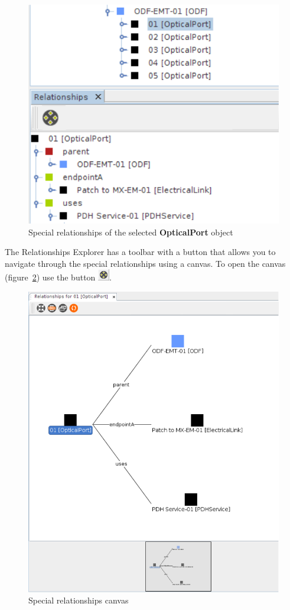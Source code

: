 \documentclass[a4paper]{article}
\begin{document}
		\begin{figure}[h!]
			\centering
			\includegraphics[width=0.4\linewidth]{img/navigation_tree_relationship_explorer.png}
			\caption{Special relationships of the selected \textbf{OpticalPort} object}
			\label{fig:navigation_tree_relationship_explorer}
		\end{figure}
		
		The Relationships Explorer has a toolbar with a button that allows you to navigate through the special relationships using a canvas. To open the canvas (figure~\ref{fig:graphical_representation_relationships}) use the button \includegraphics[width=0.5cm]{img/icon_graphical_representation_relationships.png}.
						
		\begin{figure}[h!]
			\centering
			\includegraphics[width=0.8\linewidth]{img/graphical_representation_relationships.png}
			\caption{Special relationships canvas}
			\label{fig:graphical_representation_relationships}
		\end{figure}
			
\end{document}
